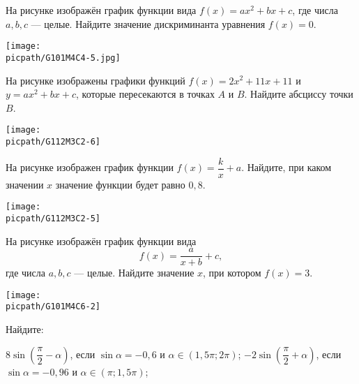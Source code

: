\begin{class}[number=5]
\begin{listofex}
		\item
	\begin{minipage}[t]{\bodywidth}
			На рисунке изображён график функции вида \(f(x)=ax^2+bx+c\), где числа \(a, b, c\) --- целые. Найдите значение дискриминанта уравнения \(f(x)=0\).
		\end{minipage}
	\begin{minipage}[t]{\picwidth}
			\texttt{[image: \\picpath/G101M4C4-5.jpg]}
		\end{minipage}
		
		\item
		\begin{minipage}[t]{\bodywidth}
			На рисунке изображены графики функций \( f(x)=2x^2+11x+11 \) и \( y=ax^2+bx+c \), которые пересекаются в точках \( A \) и \( B \). Найдите абсциссу точки \( B \).
		\end{minipage}
		\begin{minipage}[t]{\picwidth}
			\texttt{[image: \\picpath/G112M3C2-6]}
		\end{minipage}
			\item
		\begin{minipage}[t]{\bodywidth}
			На рисунке изображен график функции \( f(x)=\dfrac{k}{x}+a \). Найдите, при каком значении \( x \) значение функции будет равно \( 0,8 \).
		\end{minipage}
		\begin{minipage}[t]{\picwidth}
			\texttt{[image: \\picpath/G112M3C2-5]}
		\end{minipage}
		\item
		\begin{minipage}[t]{\bodywidth}
			На рисунке изображён график функции вида \[ f(x)=\dfrac{a}{x+b}+c, \] где числа \(a, b, c\) --- целые. Найдите значение \(x\), при котором \(f(x)=3\).
		\end{minipage}
		\hspace{0.02\linewidth}
		\begin{minipage}[t]{\picwidth}
			\texttt{[image: \\picpath/G101M4C6-2]}
		\end{minipage}
		\newpage
		\item Найдите:
		\begin{tasks}
			\task \( 8 \sin \left( \dfrac{ \pi }{ 2 }- \alpha \right) \), если \( \sin \alpha = -0,6 \) и \( \alpha \in (1,5\pi;2\pi) \);
			\task \( -2 \sin \left( \dfrac{ \pi }{ 2 }+\alpha \right) \), если \( \sin \alpha = -0,96 \) и \( \alpha \in (\pi;1,5\pi) \);

\end{tasks}
\end{listofex}
\end{class}
